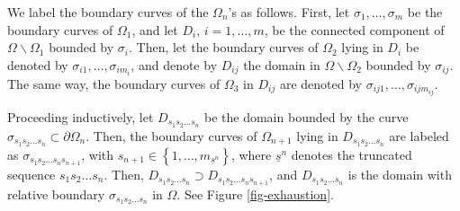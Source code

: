 \documentclass[11pt,a4paper,reqno]{amsart}
\theoremstyle{plain}
\theoremstyle{definition}
\theoremstyle{plain}
\begin{document}
We label the boundary curves of the $ {\Omega_n}$'s as follows.  First, let $ \sigma_1, \dots,\sigma_{m} $ be the boundary curves of $ \Omega_1 $, and let $ D_i $, $ i=1,\dots, m $, be the connected component of $ \Omega\smallsetminus \Omega_1 $ bounded by $ \sigma_i $. Then, let the boundary curves  of $ \Omega_2 $ lying in $ D_i $ be denoted by $ \sigma_{i1}, \dots,\sigma_{im_i} $, and denote by $ D_{ij} $ the domain  in $ \Omega\smallsetminus \Omega_2 $ bounded by $ \sigma_{ij}$. The same way, the boundary curves of $ \Omega_3 $  in $ D_{ij} $ are denoted by $ \sigma_{ij1},\dots,  \sigma_{ijm_{ij}} $.

Proceeding inductively, let $ D_{s_1s_2\dots s_{n}} $ be the domain bounded by the curve $ \sigma_{s_1s_2\dots s_{n}}\subset\partial \Omega_n
 $. Then, the boundary curves  of $ \Omega_{n+1} $ lying in $ D_ {s_1s_2\dots s_{n}}$ are labeled as  $ \sigma_{s_1s_2\dots s_{n}s_{n+1}} $, with $ s_{n+1}\in \left\lbrace 1, \dots, m_{\underline{s}^{n}} \right\rbrace  $, where $ \underline{s}^{n} $ denotes the truncated sequence $ s_1s_2\dots s_{n} $. Then,  $ D_{s_1s_2\dots s_{n}}\supset  D_{s_1s_2\dots s_ns_{n+1}}$, and $  D_{s_1s_2\dots s_{n}} $ is the domain with relative boundary $ \sigma_ {s_1s_2\dots s_{n}}$ in $ \Omega $. See Figure \ref{fig-exhaustion}.
\end{document}

